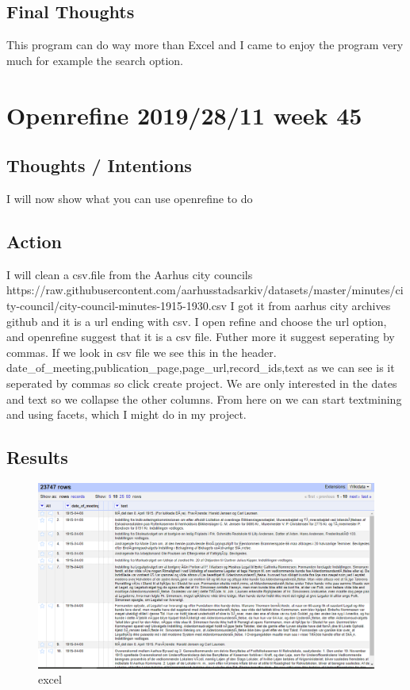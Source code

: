 \documentclass{article}
\begin{document}
\subsection{Final Thoughts} This program can do way more than Excel and I came to enjoy the program very much for example the search option.\\

\section{Openrefine 2019/28/11 week 45}
\subsection{Thoughts / Intentions} I will now show what you can use openrefine to do 
\subsection{Action} I will clean a csv.file from the Aarhus city councils https://raw.githubusercontent.com/aarhusstadsarkiv/datasets/master/minutes/city-council/city-council-minutes-1915-1930.csv I got it from aarhus city archives github and it is a url ending with csv. I open refine and choose the url option, and openrefine suggest that it is a csv file. Futher more it suggest seperating by commas. If we look in csv file we see this in the header. date\_of\_meeting,publication\_page,page\_url,record\_ids,text as we can see is it seperated by commas so click create project. We are only interested in the dates and text so we collapse the other columns. From here on we can start textmining and using facets, which I might do in my project.
\subsection{Results} 
\begin{figure}[H]
    \centering
    \includegraphics[width=\textwidth]{openrefine.PNG}
    \caption{excel}
    \label{fig:bil7}
\end{figure}\\
\end{document}
